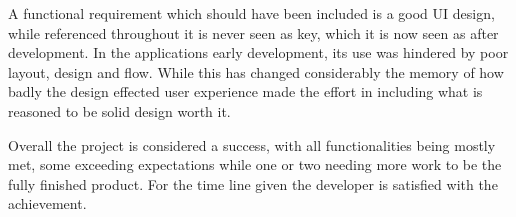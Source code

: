 A functional requirement which should have been included is a good UI design, while referenced throughout it is never seen as key, which it is now seen as after development. In the applications early development, its use was hindered by poor layout, design and flow. While this has changed considerably the memory of how badly the design effected user experience made the effort in including what is reasoned to be solid design worth it.

Overall the project is considered a success, with all functionalities being mostly met, some exceeding expectations while one or two needing more work to be the fully finished product. For the time line given the developer is satisfied with the achievement. 

 